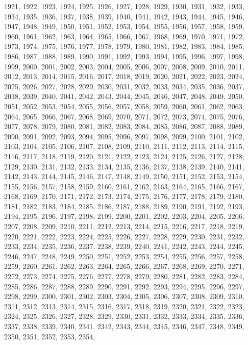 1921,
1922,
1923,
1924,
1925,
1926,
1927,
1928,
1929,
1930,
1931,
1932,
1933,
1934,
1935,
1936,
1937,
1938,
1939,
1940,
1941,
1942,
1943,
1944,
1945,
1946,
1947,
1948,
1949,
1950,
1951,
1952,
1953,
1954,
1955,
1956,
1957,
1958,
1959,
1960,
1961,
1962,
1963,
1964,
1965,
1966,
1967,
1968,
1969,
1970,
1971,
1972,
1973,
1974,
1975,
1976,
1977,
1978,
1979,
1980,
1981,
1982,
1983,
1984,
1985,
1986,
1987,
1988,
1989,
1990,
1991,
1992,
1993,
1994,
1995,
1996,
1997,
1998,
1999,
2000,
2001,
2002,
2003,
2004,
2005,
2006,
2007,
2008,
2009,
2010,
2011,
2012,
2013,
2014,
2015,
2016,
2017,
2018,
2019,
2020,
2021,
2022,
2023,
2024,
2025,
2026,
2027,
2028,
2029,
2030,
2031,
2032,
2033,
2034,
2035,
2036,
2037,
2038,
2039,
2040,
2041,
2042,
2043,
2044,
2045,
2046,
2047,
2048,
2049,
2050,
2051,
2052,
2053,
2054,
2055,
2056,
2057,
2058,
2059,
2060,
2061,
2062,
2063,
2064,
2065,
2066,
2067,
2068,
2069,
2070,
2071,
2072,
2073,
2074,
2075,
2076,
2077,
2078,
2079,
2080,
2081,
2082,
2083,
2084,
2085,
2086,
2087,
2088,
2089,
2090,
2091,
2092,
2093,
2094,
2095,
2096,
2097,
2098,
2099,
2100,
2101,
2102,
2103,
2104,
2105,
2106,
2107,
2108,
2109,
2110,
2111,
2112,
2113,
2114,
2115,
2116,
2117,
2118,
2119,
2120,
2121,
2122,
2123,
2124,
2125,
2126,
2127,
2128,
2129,
2130,
2131,
2132,
2133,
2134,
2135,
2136,
2137,
2138,
2139,
2140,
2141,
2142,
2143,
2144,
2145,
2146,
2147,
2148,
2149,
2150,
2151,
2152,
2153,
2154,
2155,
2156,
2157,
2158,
2159,
2160,
2161,
2162,
2163,
2164,
2165,
2166,
2167,
2168,
2169,
2170,
2171,
2172,
2173,
2174,
2175,
2176,
2177,
2178,
2179,
2180,
2181,
2182,
2183,
2184,
2185,
2186,
2187,
2188,
2189,
2190,
2191,
2192,
2193,
2194,
2195,
2196,
2197,
2198,
2199,
2200,
2201,
2202,
2203,
2204,
2205,
2206,
2207,
2208,
2209,
2210,
2211,
2212,
2213,
2214,
2215,
2216,
2217,
2218,
2219,
2220,
2221,
2222,
2223,
2224,
2225,
2226,
2227,
2228,
2229,
2230,
2231,
2232,
2233,
2234,
2235,
2236,
2237,
2238,
2239,
2240,
2241,
2242,
2243,
2244,
2245,
2246,
2247,
2248,
2249,
2250,
2251,
2252,
2253,
2254,
2255,
2256,
2257,
2258,
2259,
2260,
2261,
2262,
2263,
2264,
2265,
2266,
2267,
2268,
2269,
2270,
2271,
2272,
2273,
2274,
2275,
2276,
2277,
2278,
2279,
2280,
2281,
2282,
2283,
2284,
2285,
2286,
2287,
2288,
2289,
2290,
2291,
2292,
2293,
2294,
2295,
2296,
2297,
2298,
2299,
2300,
2301,
2302,
2303,
2304,
2305,
2306,
2307,
2308,
2309,
2310,
2311,
2312,
2313,
2314,
2315,
2316,
2317,
2318,
2319,
2320,
2321,
2322,
2323,
2324,
2325,
2326,
2327,
2328,
2329,
2330,
2331,
2332,
2333,
2334,
2335,
2336,
2337,
2338,
2339,
2340,
2341,
2342,
2343,
2344,
2345,
2346,
2347,
2348,
2349,
2350,
2351,
2352,
2353,
2354,
